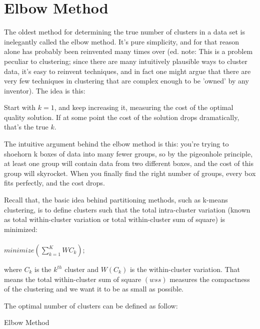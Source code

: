 \section{Elbow Method}
The oldest method for determining the true number of clusters in a data set is inelegantly called the elbow method.
It's pure simplicity, and for that reason alone has probably been reinvented many times over (ed. note:
This is a problem peculiar to clustering; since there are many intuitively plausible ways to cluster data,
it's easy to reinvent techniques, and in fact one might argue that there are very few techniques in clustering
that are complex enough to be 'owned' by any inventor). The idea is this:

    Start with $k=1$, and keep increasing it, measuring the cost of the optimal quality solution.
    If at some point the cost of the solution drops dramatically, that's the true $k$.

The intuitive argument behind the elbow method is this: you're trying to shoehorn k boxes of data into many
fewer groups, so by the pigeonhole principle, at least one group will contain data from two different boxes,
and the cost of this group will skyrocket. When you finally find the right number of groups, every box fits
perfectly, and the cost drops.

Recall that, the basic idea behind partitioning methods, such as k-means clustering,
is to define clusters such that the total intra-cluster variation (known as total within-cluster
variation or total within-cluster sum of square) is minimized:\\\\
$minimize(\sum_{k=1}^{K}WC_k)$;

where $C_k$ is the $k^{th}$ cluster and $W(C_k)$ is the within-cluster variation.
That means the total within-cluster sum of square $(wss)$ measures the compactness of the clustering and we want
it to be as small as possible.

The optimal number of clusters can be defined as follow:

\begin{algorithm}
  \caption{Elbow Method}
  \label{alg1}
  \begin{algorithmic}
    
  \end{algorithmic}
\end{algorithm}


